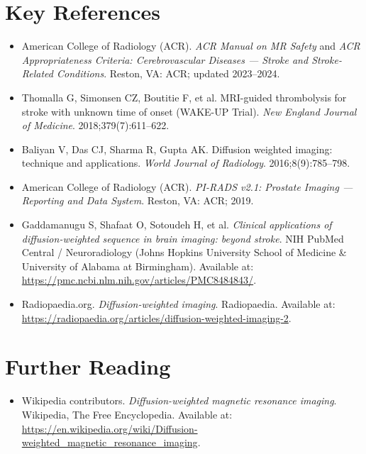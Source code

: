\section{Key References}
\begin{itemize}
\item American College of Radiology (ACR). \textit{ACR Manual on MR Safety} and \textit{ACR Appropriateness Criteria: Cerebrovascular Diseases --- Stroke and Stroke-Related Conditions}. Reston, VA: ACR; updated 2023--2024.
\item Thomalla G, Simonsen CZ, Boutitie F, et al. MRI-guided thrombolysis for stroke with unknown time of onset (WAKE-UP Trial). \textit{New England Journal of Medicine}. 2018;379(7):611--622.
\item Baliyan V, Das CJ, Sharma R, Gupta AK. Diffusion weighted imaging: technique and applications. \textit{World Journal of Radiology}. 2016;8(9):785--798.
\item American College of Radiology (ACR). \textit{PI-RADS v2.1: Prostate Imaging --- Reporting and Data System}. Reston, VA: ACR; 2019.
\item Gaddamanugu S, Shafaat O, Sotoudeh H, et al. \textit{Clinical applications of diffusion-weighted sequence in brain imaging: beyond stroke}. NIH PubMed Central / Neuroradiology (Johns Hopkins University School of Medicine \& University of Alabama at Birmingham). Available at: \url{https://pmc.ncbi.nlm.nih.gov/articles/PMC8484843/}.
\item Radiopaedia.org. \textit{Diffusion-weighted imaging}. Radiopaedia. Available at: \url{https://radiopaedia.org/articles/diffusion-weighted-imaging-2}.
\end{itemize}

\section{Further Reading}
\begin{itemize}
  \item Wikipedia contributors. \textit{Diffusion-weighted magnetic resonance imaging}. Wikipedia, The Free Encyclopedia. Available at: \url{https://en.wikipedia.org/wiki/Diffusion-weighted_magnetic_resonance_imaging}.
\end{itemize}
